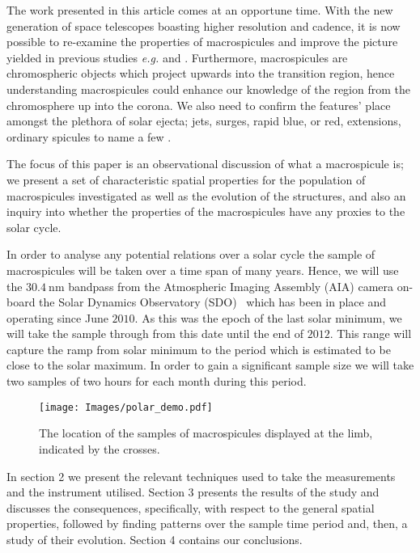 The work presented in this article comes at an opportune time. With the new generation of space telescopes boasting higher resolution and cadence, it is now possible to re-examine the properties of macrospicules and improve the picture yielded in previous studies \emph{e.g.} \citealt{Bohlin1975} and \citealt{Dere89}. Furthermore, macrospicules are chromospheric objects which project upwards into the transition region, hence understanding macrospicules could enhance our knowledge of the region from the chromosphere up into the corona. We also need to confirm the features' place amongst the plethora of solar ejecta; jets, surges, rapid blue, or red, extensions, ordinary spicules to name a few \citep{Tsiropoula2012}.

The focus of this paper is an observational discussion of what a macrospicule is; we present a set of characteristic spatial properties for the population of macrospicules investigated as well as the evolution of the structures, and also an inquiry into whether the properties of the macrospicules have any proxies to the solar cycle.

In order to analyse any potential relations over a solar cycle the sample of macrospicules will be taken over a time span of many years. Hence, we will use the $30.4\ \textrm{nm}$ bandpass from the Atmospheric Imaging Assembly (AIA) camera on-board the Solar Dynamics Observatory (SDO) \citep{AIAspec}\, which has been in place and operating since June $2010$. As this was the epoch of the last solar minimum, we will take the sample through from this date until the end of $2012$. This range will capture the ramp from solar minimum to the period which is estimated to be close to the solar maximum. In order to gain a significant sample size we will take two samples of two hours for each month during this period.

\begin{figure}[h!]
	\centering
	\texttt{[image: Images/polar\_demo.pdf]}
	\caption{\small The location of the samples of macrospicules displayed at the limb, indicated by the crosses.}
	\label{fig:polar-sample}
\end{figure}


In section 2 we present the relevant techniques used to take the measurements and the instrument utilised. Section 3 presents the results of the study and discusses the consequences, specifically, with respect to the general spatial properties, followed by finding patterns over the sample time period and, then, a study of their evolution. Section 4 contains our conclusions.   


